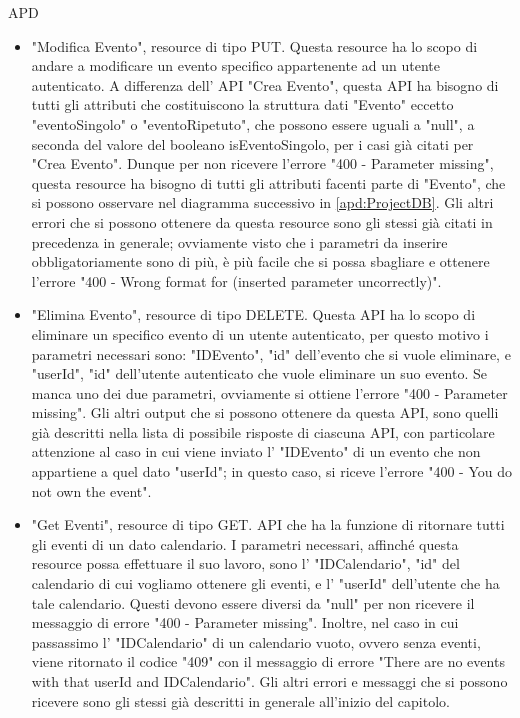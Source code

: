 \begin{listaPersonale} {APD}
\begin{listaPersonale2}[APD]{}
\begin{listaPersonale3}[APD]{}
\begin{itemize}
                \item "Modifica Evento", resource di tipo PUT. Questa resource ha lo scopo di andare a modificare un evento specifico appartenente ad un utente autenticato. A differenza dell' API "Crea Evento", questa API ha bisogno di tutti gli attributi che costituiscono la struttura dati "Evento" eccetto "eventoSingolo" o "eventoRipetuto", che possono essere uguali a "null", a seconda del valore del booleano isEventoSingolo, per i casi già citati per "Crea Evento". Dunque per non ricevere l'errore "400 - Parameter missing", questa resource ha bisogno di tutti gli attributi facenti parte di "Evento", che si possono osservare nel diagramma successivo in \ref{apd:ProjectDB}. Gli altri errori che si possono ottenere da questa resource sono gli stessi già citati in precedenza in generale; ovviamente visto che i parametri da inserire obbligatoriamente sono di più, è più facile che si possa sbagliare e ottenere l'errore "400 - Wrong format for (inserted parameter uncorrectly)".
                \item "Elimina Evento", resource di tipo DELETE. Questa API ha lo scopo di eliminare un specifico evento di un utente autenticato, per questo motivo i parametri necessari sono: "IDEvento", "id" dell'evento che si vuole eliminare, e "userId", "id" dell'utente autenticato che vuole eliminare un suo evento. Se manca uno dei due parametri, ovviamente si ottiene l'errore "400 - Parameter missing". Gli altri output che si possono ottenere da questa API, sono quelli già descritti nella lista di possibile risposte di ciascuna API, con particolare attenzione al caso in cui viene inviato l' "IDEvento" di un evento che non appartiene a quel dato "userId"; in questo caso, si riceve l'errore "400 - You do not own the event".
                \item "Get Eventi", resource di tipo GET. API che ha la funzione di ritornare tutti gli eventi di un dato calendario. I parametri necessari, affinché questa resource possa effettuare il suo lavoro, sono l' "IDCalendario", "id" del calendario di cui vogliamo ottenere gli eventi, e l' "userId" dell'utente che ha tale calendario. Questi devono essere diversi da "null" per non ricevere il messaggio di errore "400 - Parameter missing". Inoltre, nel caso in cui passassimo l' "IDCalendario" di un calendario vuoto, ovvero senza eventi, viene ritornato il codice "409" con il messaggio di errore "There are no events with that userId and IDCalendario". Gli altri errori e messaggi che si possono ricevere sono gli stessi già descritti in generale all'inizio del capitolo.

\end{itemize}
\end{listaPersonale3}
\end{listaPersonale2}
\end{listaPersonale}
